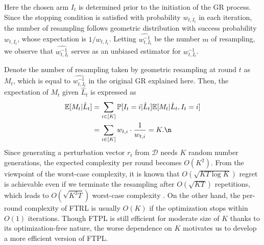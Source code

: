

Here the chosen arm $I_t$ is determined prior to the initiation of the GR process. Since the stopping condition is satisfied with probability $w_{t,I_t}$ in each iteration, the number of resampling follows geometric distribution with success probability $w_{t,I_t}$, whose expectation is $1/w_{t,I_t}$.
Letting $\widehat{w_{t,I_t}^{-1}}$ be the number $m$ of resampling,
we observe that 
$\widehat{w_{t,I_t}^{-1}}$ serves as an unbiased estimator for $w_{t,I_t}^{-1}$.

Denote the number of resampling taken by geometric resampling at round $t$ as $M_t$,
which is equal to $\widehat{w_{t,I_t}^{-1}}$ in the original GR explained here.
Then, the expectation of $M_t$ given $\hat{L}_t$ is expressed as
\begin{align}
    \mathbb{E}[M_t|\hat{L}_t] &= \sum_{i\in[K]} \mathbb{P}[I_t=i|\hat{L}_t] \mathbb{E}[M_t|\hat{L}_t,I_t=i] \nonumber \\
    &= \sum_{i\in[K]} w_{t,i}\cdot\frac{1}{w_{t,i}}= K.\n
\end{align}
Since generating a perturbation vector $r_t$ from $\mathcal{D}$ needs $K$ random number generations,
the expected complexity per round becomes $O(K^2)$.
From the viewpoint of the worst-case complexity,
it is known that $O(\sqrt{KT\log K})$ regret is achievable
even if we terminate the resampling after $O(\sqrt{KT})$ repetitions, which leads to
$O(\sqrt{K^3T})$
worst-case complexity \citep{JMLR:v17:15-091}.
On the other hand,
the per-round complexity of FTRL is usually $O(K)$ if the optimization stops within $O(1)$ iterations.
Though FTPL is still efficient for moderate size of $K$ \citep{pmlr-v201-honda23a} thanks to its optimization-free nature,
the worse dependence on $K$ motivates us to develop a more efficient version of FTPL.

